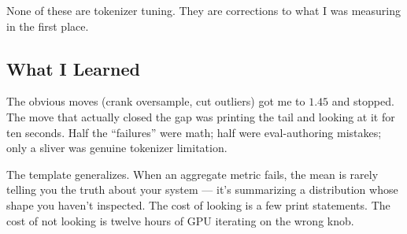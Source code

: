 None of these are tokenizer tuning. They are corrections to what I was
measuring in the first place.

\subsection*{What I Learned}

The obvious moves (crank oversample, cut outliers) got me to $1.45$ and
stopped. The move that actually closed the gap was printing the tail and
looking at it for ten seconds. Half the ``failures'' were math; half
were eval-authoring mistakes; only a sliver was genuine tokenizer
limitation.

The template generalizes. When an aggregate metric fails, the mean is
rarely telling you the truth about your system --- it's summarizing a
distribution whose shape you haven't inspected. The cost of looking is a
few print statements. The cost of not looking is twelve hours of GPU
iterating on the wrong knob.

